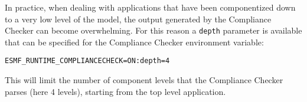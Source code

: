 In practice, when dealing with applications that have been componentized down to a very low level of the model, the output generated by the Compliance Checker can become overwhelming. For this reason a {\tt depth} parameter is available that can be specified for the Compliance Checker environment variable:
\begin{verbatim}
ESMF_RUNTIME_COMPLIANCECHECK=ON:depth=4
\end{verbatim}
This will limit the number of component levels that the Compliance Checker parses (here 4 levels), starting from the top level application.




